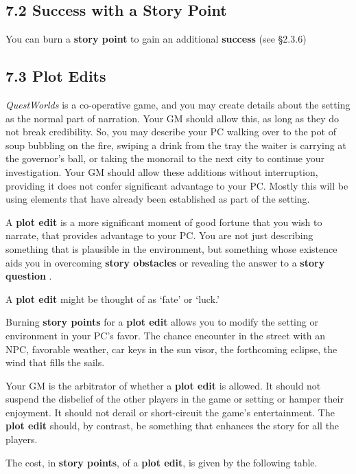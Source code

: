 \documentclass[
  11pt,
]{article}
\begin{document}
\hypertarget{success-with-a-story-point}{%
\subsection{7.2 Success with a Story
Point}\label{success-with-a-story-point}}

You can burn a \textbf{story point} to gain an additional
\textbf{success} (see §2.3.6)

\hypertarget{plot-edits}{%
\subsection{7.3 Plot Edits}\label{plot-edits}}

\emph{QuestWorlds} is a co-operative game, and you may create details
about the setting as the normal part of narration. Your GM should allow
this, as long as they do not break credibility. So, you may describe
your PC walking over to the pot of soup bubbling on the fire, swiping a
drink from the tray the waiter is carrying at the governor's ball, or
taking the monorail to the next city to continue your investigation.
Your GM should allow these additions without interruption, providing it
does not confer significant advantage to your PC. Mostly this will be
using elements that have already been established as part of the
setting.

A \textbf{plot edit} is a more significant moment of good fortune that
you wish to narrate, that provides advantage to your PC. You are not
just describing something that is plausible in the environment, but
something whose existence aids you in overcoming \textbf{story
obstacles} or revealing the answer to a \textbf{story question} .

A \textbf{plot edit} might be thought of as `fate' or `luck.'

Burning \textbf{story points} for a \textbf{plot edit} allows you to
modify the setting or environment in your PC's favor. The chance
encounter in the street with an NPC, favorable weather, car keys in the
sun visor, the forthcoming eclipse, the wind that fills the sails.

Your GM is the arbitrator of whether a \textbf{plot edit} is allowed. It
should not suspend the disbelief of the other players in the game or
setting or hamper their enjoyment. It should not derail or short-circuit
the game's entertainment. The \textbf{plot edit} should, by contrast, be
something that enhances the story for all the players.

The cost, in \textbf{story points}, of a \textbf{plot edit}, is given by
the following table.
\end{document}
